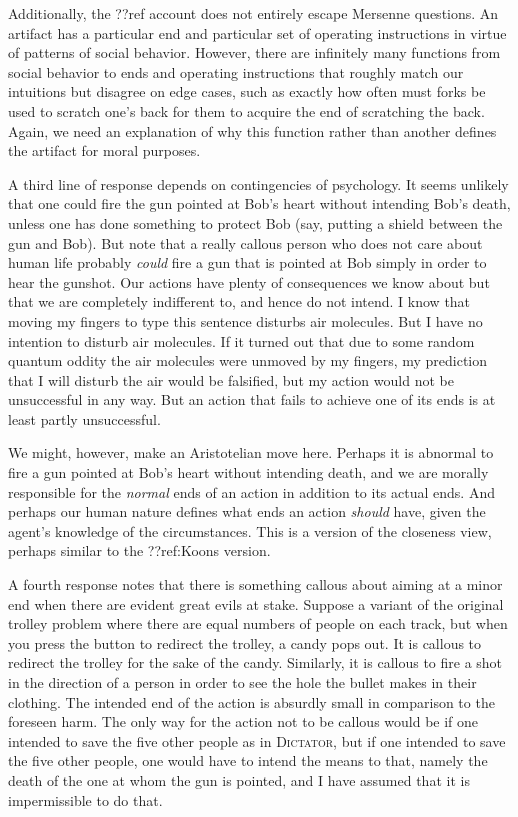 Additionally, the ??ref account does not entirely escape Mersenne questions. An artifact has a particular
end and particular set of operating instructions in virtue of patterns of social behavior. However, there are infinitely many functions 
from social behavior to ends and operating instructions that roughly match our intuitions but disagree on edge cases, such as exactly
how often must forks be used to scratch one's back for them to acquire the end of scratching the back. Again, we need an explanation
of why this function rather than another defines the artifact for moral purposes.

A third line of response depends on contingencies of psychology. It seems unlikely that one could fire the gun pointed at Bob's heart
without intending Bob's death, unless one has done something to protect Bob (say, putting a shield between the gun and Bob). 
But note that a really callous person who does not care about human life probably \textit{could} fire a gun that is 
pointed at Bob simply in order to hear the gunshot. Our actions have
plenty of consequences we know about but that we are completely indifferent to, and hence do not intend. I know that moving
my fingers to type this sentence disturbs air molecules. But I have no intention to disturb air molecules. If it turned out
that due to some random quantum oddity the air molecules were unmoved by my fingers, my prediction that I will disturb the
air would be falsified, but my action would not be unsuccessful in any way. But an action that fails to achieve one of its
ends is at least partly unsuccessful. 

We might, however, make an Aristotelian move here. Perhaps it is abnormal to fire a gun pointed at Bob's heart without intending
death, and we are morally responsible for the \textit{normal} ends of an action in addition to its actual ends. And perhaps
our human nature defines what ends an action \textit{should} have, given the agent's knowledge of the circumstances.
This is a version of the closeness view, perhaps similar to the ??ref:Koons version. 

A fourth response notes that there is something callous about aiming at a minor end when there are evident great evils at stake.
Suppose a variant of the original trolley problem where there are equal numbers of people on each track, but when you press the
button to redirect the trolley, a candy pops out. It is callous to redirect the trolley for the sake of the candy. Similarly,
it is callous to fire a shot in the direction of a person in order to see the hole the bullet makes in their clothing. The intended 
end of the action is absurdly small in comparison to the foreseen harm. The only way for the action not to be callous would be if 
one intended to save the five other people as in \textsc{Dictator}, but if one intended to save the five other people, one would 
have to intend the means to that, namely the death of the one at whom the gun is pointed, and I have assumed that it is impermissible
to do that. 


